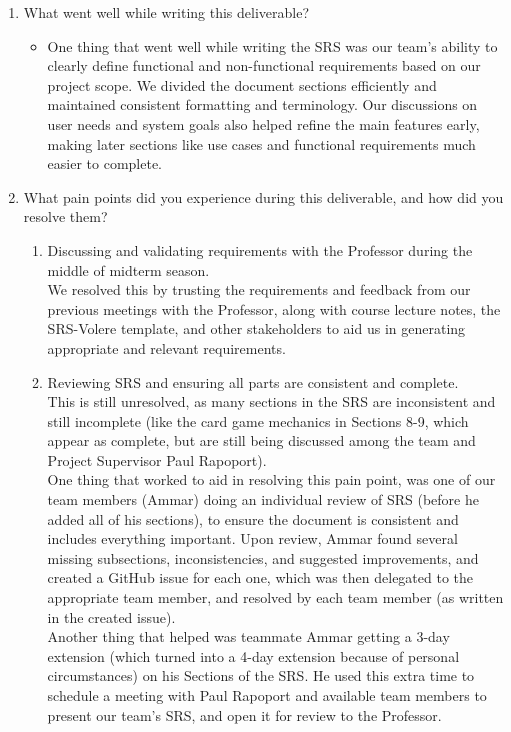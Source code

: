 \begin{enumerate}
  \item What went well while writing this deliverable?
  \begin{itemize}
  \item One thing that went well while writing the SRS was our team’s ability to clearly define
  functional and non-functional requirements based on our project scope.
  We divided the document sections efficiently and maintained consistent formatting and terminology.
  Our discussions on user needs and system goals also helped refine the main features early,
  making later sections like use cases and functional requirements much easier to complete.
  \end{itemize}

  \item What pain points did you experience during this deliverable, and how did
  you resolve them?
  \begin{enumerate}
    \item Discussing and validating requirements with the Professor during the middle of midterm season.\\
    We resolved this by trusting the requirements and feedback from our previous meetings with the Professor, along with course lecture notes, the SRS-Volere template, and other stakeholders to aid us in generating appropriate and relevant requirements.
    \item Reviewing SRS and ensuring all parts are consistent and complete.\\
    This is still unresolved, as many sections in the SRS are inconsistent and still incomplete (like the card game mechanics in Sections 8-9, which appear as complete, but are still being discussed among the team and Project Supervisor Paul Rapoport).\\
    One thing that worked to aid in resolving this pain point, was one of our team members (Ammar) doing an individual review of SRS (before he added all of his sections), to ensure the document is consistent and includes everything important. Upon review, Ammar found several missing subsections, inconsistencies, and suggested improvements, and created a GitHub issue for each one, which was then delegated to the appropriate team member, and resolved by each team member (as written in the created issue).\\
    Another thing that helped was teammate Ammar getting a 3-day extension (which turned into a 4-day extension because of personal circumstances) on his Sections of the SRS. He used this extra time to schedule a meeting with Paul Rapoport and available team members to present our team's SRS, and open it for review to the Professor.\\

\end{enumerate}
\end{enumerate}
